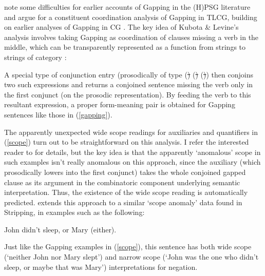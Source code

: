 \documentclass[output=paper]{langsci/langscibook}
\begin{document}
\citet{kubota-levine-nels,kubota-levine-gapping} note some
difficulties for earlier accounts of Gapping in the (H)PSG literature
\citep{sgww,abeille-ea} and argue for a constituent coordination
analysis of Gapping in TLCG, building on earlier analyses of Gapping
in CG \citep{Steedman90a-u,hendriks95,morrillsolias93}. The key idea
of Kubota \& Levine's analysis involves taking Gapping as coordination of clauses
missing a verb in the middle, which can be transparently represented
as a function from strings to strings of category {}:

\begin{exe}
 \ex\label{}
  \LexEnt{\pt{\ensuremath{\lambda} \ensuremath{\greekp}. leslie \ensuremath{\circ}\xspace \ensuremath{\greekp} \ensuremath{\circ}\xspace a \ensuremath{\circ}\xspace cd }}{\sem{ \lambda R. \exists x. \trns{cd}(x) \ensuremath{ \wedge\xspace } R(x)(\trns{l}) }}{\syncat{S\vs ((NP\ensuremath{\backslash}{}S)/NP)}}
\end{exe}
A special type of conjunction entry (prosodically of type
(\st\xspace \shortarrow \st\xspace) \shortarrow (\st\xspace
\shortarrow \st\xspace) \shortarrow (\st\xspace \shortarrow \st\xspace))
then conjoins two such expressions
and returns a conjoined sentence missing the verb only in the first
conjunct (on the prosodic representation). By feeding the verb to
this resultant expression,  a proper form-meaning  pair is obtained
for Gapping sentences like those in (\ref{gapping}).

The apparently unexpected wide scope readings for auxiliaries and
quantifiers in (\ref{scope}) turn out to be straightforward on this
analysis. I refer the interested reader to \citet{kubota-levine-gapping} for
details, but the key idea is that the apparently `anomalous' scope in
such examples isn't really anomalous on this approach, since the
auxiliary (which prosodically lowers into the first conjunct) takes
the whole conjoined gapped clause as its argument in the combinatoric
component underlying semantic interpretation. Thus, the existence
of the wide scope reading is automatically predicted.
\citet{puthawala2018} extends this approach to a similar `scope anomaly'
data found in Stripping, in examples such as the following:

\begin{exe}
 \ex   John didn't sleep, or Mary (either).
\end{exe}
Just like the Gapping examples in (\ref{scope}), this sentence has
both wide scope (`neither John nor Mary slept') and narrow scope
(`John was the one who didn't sleep, or maybe that was Mary')
interpretations for negation.
\end{document}
